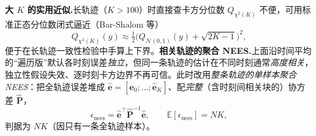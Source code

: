 \textbf{大 $K$ 的实用近似.}\;长轨迹（$K>100$）时直接查卡方分位数 $Q_{\chi^2(K)}$ 不便，可用标准正态分位数闭式逼近（Bar-Shalom 等\cite{barfoot2024state}）
\begin{equation}
  Q_{\chi^2(K)}(y)\approx\tfrac12\big(Q_{\mathcal{N}(0,1)}(y)+\sqrt{2K-1}\big)^2,
  \label{eq:chi2-largeK}
\end{equation}
便于在长轨迹一致性检验中手算上下界。\textbf{相关轨迹的聚合 NEES.}\;上面沿时间平均的“遍历版”默认各时刻误差\emph{独立}，但同一条轨迹的估计在不同时刻通常\emph{高度相关}，独立性假设失效、逐时刻卡方边界不再可信。此时改用\emph{整条轨迹的单样本聚合 NEES}：把全轨迹误差堆成 $\hat{\mathbf{e}}=[\hat{\mathbf{e}}_0;\dots;\hat{\mathbf{e}}_K]$、配\emph{完整}（含时刻间相关块的）协方差 $\hat{\mathbf{P}}$，
\begin{equation}
  \epsilon_{\text{nees}}=\hat{\mathbf{e}}^\top\hat{\mathbf{P}}^{-1}\hat{\mathbf{e}},\qquad \mathbb{E}[\epsilon_{\text{nees}}]=NK,
  \label{eq:nees-aggregate}
\end{equation}
判据为 $NK$（因只有一条全轨迹样本）\cite{barfoot2024state}。

